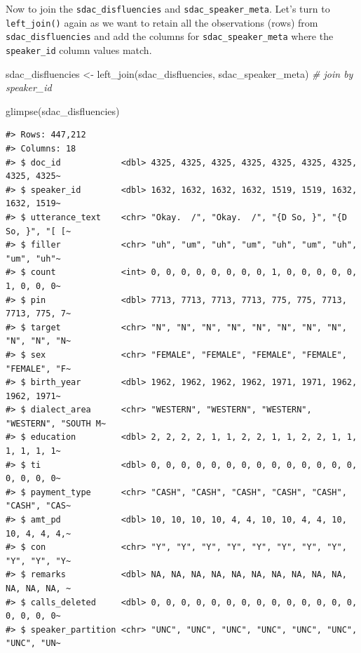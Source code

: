 \documentclass[
  letterpaper,
]{scrbook}
\newenvironment{Shaded}{\begin{snugshade}}{\end{snugshade}}
\newcommand{\CommentTok}[1]{\textcolor[rgb]{0.00,0.00,0.00}{\textit{#1}}}
\newcommand{\FunctionTok}[1]{\textcolor[rgb]{0.00,0.00,0.00}{#1}}
\newcommand{\NormalTok}[1]{\textcolor[rgb]{0.00,0.00,0.00}{#1}}
\newcommand{\OtherTok}[1]{\textcolor[rgb]{0.00,0.00,0.00}{#1}}
\begin{document}
Now to join the \texttt{sdac\_disfluencies} and
\texttt{sdac\_speaker\_meta}. Let's turn to \texttt{left\_join()} again
as we want to retain all the observations (rows) from
\texttt{sdac\_disfluencies} and add the columns for
\texttt{sdac\_speaker\_meta} where the \texttt{speaker\_id} column
values match.

\begin{Shaded}
\begin{Highlighting}[]
\NormalTok{sdac\_disfluencies }\OtherTok{\textless{}{-}} 
  \FunctionTok{left\_join}\NormalTok{(sdac\_disfluencies, sdac\_speaker\_meta) }\CommentTok{\# join by \textasciigrave{}\textasciigrave{}speaker\_id\textasciigrave{}}

\FunctionTok{glimpse}\NormalTok{(sdac\_disfluencies)}
\end{Highlighting}
\end{Shaded}

\begin{verbatim}
#> Rows: 447,212
#> Columns: 18
#> $ doc_id            <dbl> 4325, 4325, 4325, 4325, 4325, 4325, 4325, 4325, 4325~
#> $ speaker_id        <dbl> 1632, 1632, 1632, 1632, 1519, 1519, 1632, 1632, 1519~
#> $ utterance_text    <chr> "Okay.  /", "Okay.  /", "{D So, }", "{D So, }", "[ [~
#> $ filler            <chr> "uh", "um", "uh", "um", "uh", "um", "uh", "um", "uh"~
#> $ count             <int> 0, 0, 0, 0, 0, 0, 0, 0, 1, 0, 0, 0, 0, 0, 1, 0, 0, 0~
#> $ pin               <dbl> 7713, 7713, 7713, 7713, 775, 775, 7713, 7713, 775, 7~
#> $ target            <chr> "N", "N", "N", "N", "N", "N", "N", "N", "N", "N", "N~
#> $ sex               <chr> "FEMALE", "FEMALE", "FEMALE", "FEMALE", "FEMALE", "F~
#> $ birth_year        <dbl> 1962, 1962, 1962, 1962, 1971, 1971, 1962, 1962, 1971~
#> $ dialect_area      <chr> "WESTERN", "WESTERN", "WESTERN", "WESTERN", "SOUTH M~
#> $ education         <dbl> 2, 2, 2, 2, 1, 1, 2, 2, 1, 1, 2, 2, 1, 1, 1, 1, 1, 1~
#> $ ti                <dbl> 0, 0, 0, 0, 0, 0, 0, 0, 0, 0, 0, 0, 0, 0, 0, 0, 0, 0~
#> $ payment_type      <chr> "CASH", "CASH", "CASH", "CASH", "CASH", "CASH", "CAS~
#> $ amt_pd            <dbl> 10, 10, 10, 10, 4, 4, 10, 10, 4, 4, 10, 10, 4, 4, 4,~
#> $ con               <chr> "Y", "Y", "Y", "Y", "Y", "Y", "Y", "Y", "Y", "Y", "Y~
#> $ remarks           <dbl> NA, NA, NA, NA, NA, NA, NA, NA, NA, NA, NA, NA, NA, ~
#> $ calls_deleted     <dbl> 0, 0, 0, 0, 0, 0, 0, 0, 0, 0, 0, 0, 0, 0, 0, 0, 0, 0~
#> $ speaker_partition <chr> "UNC", "UNC", "UNC", "UNC", "UNC", "UNC", "UNC", "UN~
\end{verbatim}
\end{document}
